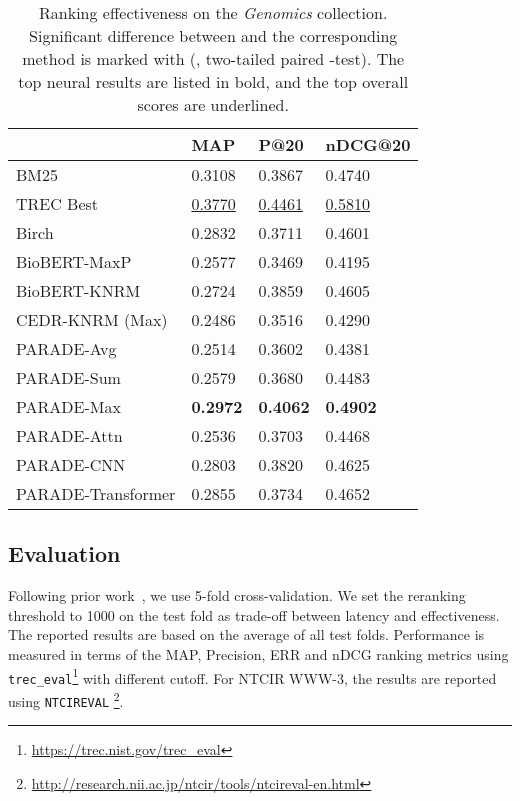 \begin{table}[tb]
\centering
    \caption{Ranking effectiveness on the {\it Genomics} collection. Significant difference between  and the corresponding method is marked with  (, two-tailed paired -test). The top neural results are listed in bold, and the top overall scores are underlined.}
    \label{tab:genomics}
\begin{tabular}{l|lll} \toprule
& MAP & P@20 & nDCG@20  \\ \midrule
BM25                & 0.3108 & 0.3867 & 0.4740 \\
TREC Best           & \underline{0.3770} & \underline{0.4461} & \underline{0.5810} \\ \midrule
Birch               & 0.2832 & 0.3711 & 0.4601 \\
BioBERT-MaxP        & 0.2577 & 0.3469 & 0.4195 \\
BioBERT-KNRM        & 0.2724 & 0.3859 & 0.4605 \\
CEDR-KNRM (Max)     & 0.2486 & 0.3516 & 0.4290 \\
\midrule
PARADE-Avg          & 0.2514 & 0.3602 & 0.4381 \\
PARADE-Sum          & 0.2579 & 0.3680 & 0.4483 \\
PARADE-Max          &\bf0.2972 &\bf0.4062 & \bf 0.4902 \\
PARADE-Attn         & 0.2536 & 0.3703 & 0.4468 \\
PARADE-CNN          & 0.2803 & 0.3820 & 0.4625 \\
PARADE-Transformer  & 0.2855 & 0.3734 & 0.4652 \\ \bottomrule
\end{tabular}
\end{table}


\subsection{Evaluation}
Following prior work~\cite{DBLP:conf/sigir/DaiC19, DBLP:conf/sigir/MacAvaneyYCG19}, we use 5-fold cross-validation.
We set the reranking threshold to 1000 on the test fold as trade-off between latency and effectiveness.
The reported results are based on the average of all test folds.
Performance is measured in terms of the MAP, Precision, ERR and nDCG ranking metrics using \texttt{trec\_eval}\footnote{\url{https://trec.nist.gov/trec_eval}} with different cutoff.
For NTCIR WWW-3, the results are reported using \texttt{NTCIREVAL} \footnote{\url{http://research.nii.ac.jp/ntcir/tools/ntcireval-en.html}}.

